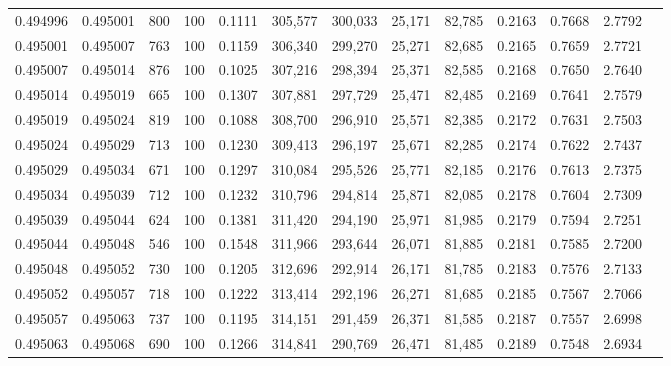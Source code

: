 \begin{tabular}{rrrrrrrrrrrrr}
0.494996 & 0.495001 &   800 & 100 &                                     0.1111 & 305,577 & 300,033 &  25,171 &  82,785 & 0.2163 & 0.7668 & 2.7792 \\
0.495001 & 0.495007 &   763 & 100 &                                     0.1159 & 306,340 & 299,270 &  25,271 &  82,685 & 0.2165 & 0.7659 & 2.7721 \\
0.495007 & 0.495014 &   876 & 100 &                                     0.1025 & 307,216 & 298,394 &  25,371 &  82,585 & 0.2168 & 0.7650 & 2.7640 \\
0.495014 & 0.495019 &   665 & 100 &                                     0.1307 & 307,881 & 297,729 &  25,471 &  82,485 & 0.2169 & 0.7641 & 2.7579 \\
0.495019 & 0.495024 &   819 & 100 &                                     0.1088 & 308,700 & 296,910 &  25,571 &  82,385 & 0.2172 & 0.7631 & 2.7503 \\
0.495024 & 0.495029 &   713 & 100 &                                     0.1230 & 309,413 & 296,197 &  25,671 &  82,285 & 0.2174 & 0.7622 & 2.7437 \\
0.495029 & 0.495034 &   671 & 100 &                                     0.1297 & 310,084 & 295,526 &  25,771 &  82,185 & 0.2176 & 0.7613 & 2.7375 \\
0.495034 & 0.495039 &   712 & 100 &                                     0.1232 & 310,796 & 294,814 &  25,871 &  82,085 & 0.2178 & 0.7604 & 2.7309 \\
0.495039 & 0.495044 &   624 & 100 &                                     0.1381 & 311,420 & 294,190 &  25,971 &  81,985 & 0.2179 & 0.7594 & 2.7251 \\
0.495044 & 0.495048 &   546 & 100 &                                     0.1548 & 311,966 & 293,644 &  26,071 &  81,885 & 0.2181 & 0.7585 & 2.7200 \\
0.495048 & 0.495052 &   730 & 100 &                                     0.1205 & 312,696 & 292,914 &  26,171 &  81,785 & 0.2183 & 0.7576 & 2.7133 \\
0.495052 & 0.495057 &   718 & 100 &                                     0.1222 & 313,414 & 292,196 &  26,271 &  81,685 & 0.2185 & 0.7567 & 2.7066 \\
0.495057 & 0.495063 &   737 & 100 &                                     0.1195 & 314,151 & 291,459 &  26,371 &  81,585 & 0.2187 & 0.7557 & 2.6998 \\
0.495063 & 0.495068 &   690 & 100 &                                     0.1266 & 314,841 & 290,769 &  26,471 &  81,485 & 0.2189 & 0.7548 & 2.6934 \\

\end{tabular}

